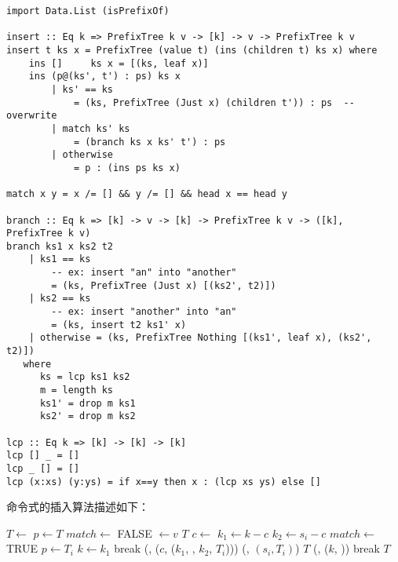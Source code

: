\documentclass[UTF8]{article}
\begin{document}
\lstset{language=Haskell}
\begin{lstlisting}[style=Haskell]
import Data.List (isPrefixOf)

insert :: Eq k => PrefixTree k v -> [k] -> v -> PrefixTree k v
insert t ks x = PrefixTree (value t) (ins (children t) ks x) where
    ins []     ks x = [(ks, leaf x)]
    ins (p@(ks', t') : ps) ks x
        | ks' == ks
            = (ks, PrefixTree (Just x) (children t')) : ps  -- overwrite
        | match ks' ks
            = (branch ks x ks' t') : ps
        | otherwise
            = p : (ins ps ks x)

match x y = x /= [] && y /= [] && head x == head y

branch :: Eq k => [k] -> v -> [k] -> PrefixTree k v -> ([k], PrefixTree k v)
branch ks1 x ks2 t2
    | ks1 == ks
        -- ex: insert "an" into "another"
        = (ks, PrefixTree (Just x) [(ks2', t2)])
    | ks2 == ks
        -- ex: insert "another" into "an"
        = (ks, insert t2 ks1' x)
    | otherwise = (ks, PrefixTree Nothing [(ks1', leaf x), (ks2', t2)])
   where
      ks = lcp ks1 ks2
      m = length ks
      ks1' = drop m ks1
      ks2' = drop m ks2

lcp :: Eq k => [k] -> [k] -> [k]
lcp [] _ = []
lcp _ [] = []
lcp (x:xs) (y:ys) = if x==y then x : (lcp xs ys) else []
\end{lstlisting}

命令式的插入算法描述如下：

\begin{algorithmic}[1]
   \State $T \gets$ 
  \EndIf
  \State $p \gets T$
  \Loop
    \State $match \gets$ FALSE
        \State {} $\gets v$
        \State \Return $T$
      \EndIf
      \State $c \gets$ 
      \State $k_1 \gets k - c$
      \State $k_2 \gets s_i - c$
        \State $match \gets$ TRUE
         
          \State $p \gets T_i$
          \State $k \gets k_1$
          \State break
        \Else {}
          \State {}(, ($c$, ($k_1$, , $k_2$, $T_i$)))
          \State {}(, $(s_i, T_i)$)
          \State \Return $T$
        \EndIf
      \EndIf
    \EndFor
     
      \State {}(, ($k$, ))
      \State break
    \EndIf
  \EndLoop
  \State \Return $T$
\EndFunction
\end{algorithmic}
\end{document}
